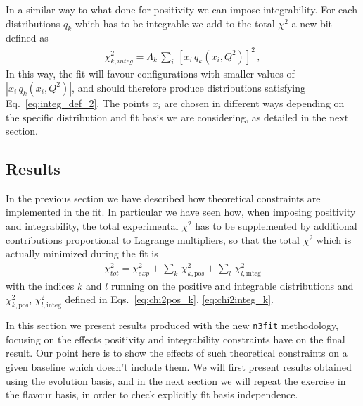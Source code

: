 %
In a similar way to what done for positivity we can impose integrability. 
For each distributions $q_k$ which has to be integrable we
add to the total $\chi^2$ a new bit defined as  
\begin{align}
	\label{eq:chi2integ_k}
	\chi^2_{k,integ} = \Lambda_k \,\sum_i \,\left[x_i\,q_k\left(x_i,Q^2\right)\right]^2\,,
\end{align}
In this way, the fit will favour configurations with smaller values of $|x_i\,q_k\left(x_i,Q^2\right)|$, and should 
therefore produce distributions satisfying Eq.~\eqref{eq:integ_def_2}. The points $x_i$ are chosen in different ways depending
on the specific distribution and fit basis we are considering, as detailed in the next section. 


\subsection{Results}
\label{sec:results_nnpdf}
In the previous section we have described how theoretical constraints are implemented in the fit.
In particular we have seen how, when imposing positivity and integrability,
the total experimental $\chi^2$ has to be supplemented by additional contributions
proportional to Lagrange multipliers, so that the total $\chi^2$ which is actually minimized
during the fit is 
\begin{align}
	\label{eq:chi2pos_integ}
	\chi^2_{tot} = \chi^2_{exp} + \sum_k\, \chi^2_{k,\text{pos}} + \sum_l\, \chi^2_{l,\text{integ}}
\end{align}
with the indices $k$ and $l$ running on the positive and integrable distributions
and $\chi^2_{k,\text{pos}}$, $\chi^2_{l,\text{integ}}$ defined in Eqs.~\eqref{eq:chi2pos_k}, \eqref{eq:chi2integ_k}.

%
In this section we present results produced with the new {\tt n3fit} methodology,
focusing on the effects positivity and integrability constraints have on the final result.
Our point here is to show the effects of such theoretical constraints on a given baseline which doesn't 
include them. We will first present results obtained using the evolution basis, and in the
next section we will repeat the exercise in the flavour basis, in order to check explicitly 
fit basis independence.

